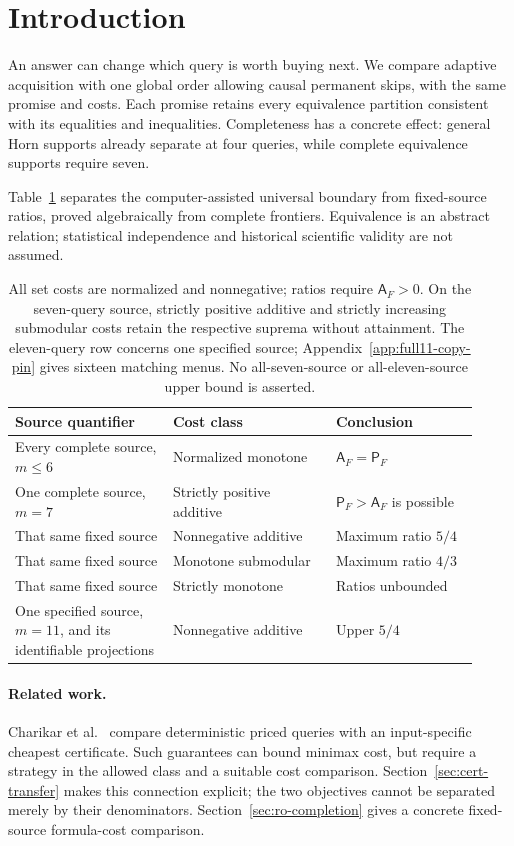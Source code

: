 \documentclass[pdflatex,sn-mathphys-num]{sn-jnl}
\newcommand{\A}{\mathsf{A}}
\newcommand{\Pcost}{\mathsf{P}}
\theoremstyle{thmstyleone}
\theoremstyle{thmstylethree}
\theoremstyle{thmstyletwo}
\begin{document}
\section{Introduction}
An answer can change which query is worth buying next. We compare adaptive acquisition with one global order allowing causal permanent skips, with the same promise and costs. Each promise retains every equivalence partition consistent with its equalities and inequalities. Completeness has a concrete effect: general Horn supports already separate at four queries, while complete equivalence supports require seven.

Table~\ref{tab:scope} separates the computer-assisted universal boundary from fixed-source ratios, proved algebraically from complete frontiers. Equivalence is an abstract relation; statistical independence and historical scientific validity are not assumed.

\begin{table}[ht]
\centering\small
\begin{tabular}{@{}>{\raggedright\arraybackslash}p{0.31\linewidth}p{0.32\linewidth}p{0.29\linewidth}@{}}\toprule
Source quantifier & Cost class & Conclusion\\\midrule
Every complete source, \mbox{$m\leq6$} & Normalized monotone & $\A_F=\Pcost_F$\\
One complete source, $m=7$ & Strictly positive additive & $\Pcost_F>\A_F$ is possible\\
That same fixed source & Nonnegative additive & Maximum ratio $5/4$\\
That same fixed source & Monotone submodular & Maximum ratio $4/3$\\
That same fixed source & Strictly monotone & Ratios unbounded\\
One specified source, \mbox{$m=11$}, and its identifiable projections & Nonnegative additive & Upper $5/4$\\\bottomrule
\end{tabular}
\caption{All set costs are normalized and nonnegative; ratios require $\A_F>0$. On the seven-query source, strictly positive additive and strictly increasing submodular costs retain the respective suprema without attainment. The eleven-query row concerns one specified source; Appendix~\ref{app:full11-copy-pin} gives sixteen matching menus. No all-seven-source or all-eleven-source upper bound is asserted.}\label{tab:scope}
\end{table}

\paragraph*{Related work.}
Charikar et al.~\cite{charikar02} compare deterministic priced queries with an input-specific cheapest certificate. Such guarantees can bound minimax cost, but require a strategy in the allowed class and a suitable cost comparison. Section~\ref{sec:cert-transfer} makes this connection explicit; the two objectives cannot be separated merely by their denominators. Section~\ref{sec:ro-completion} gives a concrete fixed-source formula-cost comparison.
\end{document}
